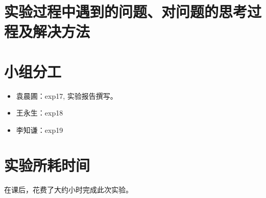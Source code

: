 \documentclass[11pt]{article}
\begin{document}






\section{实验过程中遇到的问题、对问题的思考过程及解决方法}





\section{小组分工}

\begin{itemize}
    \item 袁晨圃：exp17, 实验报告撰写。
    \item 王永生：exp18 
    \item 李知谦：exp19
\end{itemize}

\section{实验所耗时间}

\newcommand{\labTime}{20}

在课后，花费了大约\underline{\makebox[5em][c]{\labTime}}小时完成此次实验。
\end{document}

